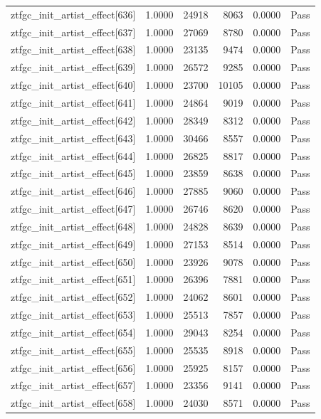 \begin{table}[htbp]
\begin{tabular}{llrrll}
ztfgc\_init\_artist\_effect[636] & 1.0000 & 24918 & 8063 & 0.0000 & Pass \\
ztfgc\_init\_artist\_effect[637] & 1.0000 & 27069 & 8780 & 0.0000 & Pass \\
ztfgc\_init\_artist\_effect[638] & 1.0000 & 23135 & 9474 & 0.0000 & Pass \\
ztfgc\_init\_artist\_effect[639] & 1.0000 & 26572 & 9285 & 0.0000 & Pass \\
ztfgc\_init\_artist\_effect[640] & 1.0000 & 23700 & 10105 & 0.0000 & Pass \\
ztfgc\_init\_artist\_effect[641] & 1.0000 & 24864 & 9019 & 0.0000 & Pass \\
ztfgc\_init\_artist\_effect[642] & 1.0000 & 28349 & 8312 & 0.0000 & Pass \\
ztfgc\_init\_artist\_effect[643] & 1.0000 & 30466 & 8557 & 0.0000 & Pass \\
ztfgc\_init\_artist\_effect[644] & 1.0000 & 26825 & 8817 & 0.0000 & Pass \\
ztfgc\_init\_artist\_effect[645] & 1.0000 & 23859 & 8638 & 0.0000 & Pass \\
ztfgc\_init\_artist\_effect[646] & 1.0000 & 27885 & 9060 & 0.0000 & Pass \\
ztfgc\_init\_artist\_effect[647] & 1.0000 & 26746 & 8620 & 0.0000 & Pass \\
ztfgc\_init\_artist\_effect[648] & 1.0000 & 24828 & 8639 & 0.0000 & Pass \\
ztfgc\_init\_artist\_effect[649] & 1.0000 & 27153 & 8514 & 0.0000 & Pass \\
ztfgc\_init\_artist\_effect[650] & 1.0000 & 23926 & 9078 & 0.0000 & Pass \\
ztfgc\_init\_artist\_effect[651] & 1.0000 & 26396 & 7881 & 0.0000 & Pass \\
ztfgc\_init\_artist\_effect[652] & 1.0000 & 24062 & 8601 & 0.0000 & Pass \\
ztfgc\_init\_artist\_effect[653] & 1.0000 & 25513 & 7857 & 0.0000 & Pass \\
ztfgc\_init\_artist\_effect[654] & 1.0000 & 29043 & 8254 & 0.0000 & Pass \\
ztfgc\_init\_artist\_effect[655] & 1.0000 & 25535 & 8918 & 0.0000 & Pass \\
ztfgc\_init\_artist\_effect[656] & 1.0000 & 25925 & 8157 & 0.0000 & Pass \\
ztfgc\_init\_artist\_effect[657] & 1.0000 & 23356 & 9141 & 0.0000 & Pass \\
ztfgc\_init\_artist\_effect[658] & 1.0000 & 24030 & 8571 & 0.0000 & Pass \\

\end{tabular}
\end{table}
